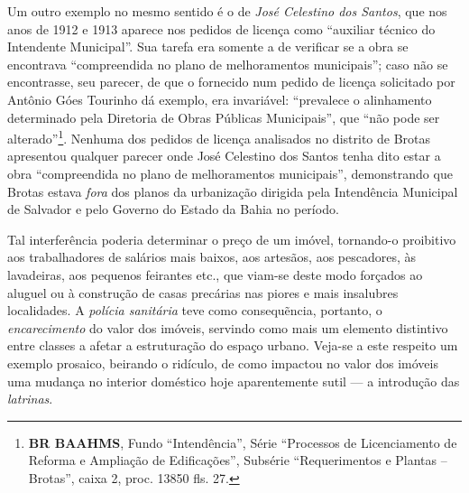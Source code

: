 Um outro exemplo no mesmo sentido é o de \textit{José Celestino dos Santos}, que nos anos de 1912 e 1913 aparece nos pedidos de licença como ``auxiliar técnico do Intendente Municipal''. Sua tarefa era somente a de verificar se a obra se encontrava ``compreendida no plano de melhoramentos municipais''; caso não se encontrasse, seu parecer, de que o fornecido num pedido de licença solicitado por Antônio Góes Tourinho dá exemplo, era invariável: ``prevalece o  alinhamento determinado pela Diretoria de Obras Públicas Municipais'', que ``não pode ser alterado''\footnote{\textbf{BR BAAHMS}, Fundo ``Intendência'', Série ``Processos de Licenciamento de Reforma e Ampliação de Edificações'', Subsérie ``Requerimentos e Plantas – Brotas'', caixa 2, proc. 13850 fls. 27.}. Nenhuma dos pedidos de licença analisados no distrito de Brotas apresentou qualquer parecer onde José Celestino dos Santos tenha dito estar a obra ``compreendida no plano de melhoramentos municipais'', demonstrando que Brotas estava \textit{fora} dos planos da urbanização dirigida pela Intendência Municipal de Salvador e pelo Governo do Estado da Bahia no período.

Tal interferência poderia determinar o preço de um imóvel, tornando-o proibitivo aos trabalhadores de salários mais baixos, aos artesãos, aos pescadores, às lavadeiras, aos pequenos feirantes etc., que viam-se deste modo forçados ao aluguel ou à construção de casas precárias nas piores e mais insalubres localidades. A \textit{polícia sanitária} teve como consequẽncia, portanto, o \textit{encarecimento} do valor dos imóveis, servindo como mais um elemento distintivo entre classes a afetar a estruturação do espaço urbano. Veja-se a este respeito um exemplo prosaico, beirando o ridículo, de como impactou no valor dos imóveis uma mudança no interior doméstico hoje aparentemente sutil --- a introdução das \textit{latrinas}. 

